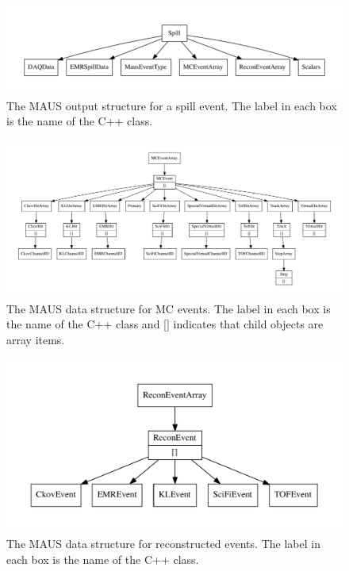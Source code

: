 \documentclass[11pt,a4paper]{article}
\begin{document}
\begin{figure}[!p]
\centering
\includegraphics[width=\textwidth]{figs/spill_datastructure.pdf}
\caption{The MAUS output structure for a spill event. The label in each box is the name of the C++ class.}
\label{fig:datastructure-spill}
\end{figure}

\begin{figure}[ptb]
\centering
\includegraphics[width=\textwidth]{figs/mc_datastructure.pdf}
\caption{The MAUS data structure for MC events. The label in each box is the name of the C++ class and [] indicates that child objects are array items.}
\label{fig:datastructure-mc}
\end{figure}

\begin{figure}[ptb]
\centering
\includegraphics[width=\textwidth]{figs/recon_datastructure.pdf}
\caption{The MAUS data structure for reconstructed events. The label in each box is the name of the C++ class.}
\label{fig:datastructure-recon}
\end{figure}
\end{document}
